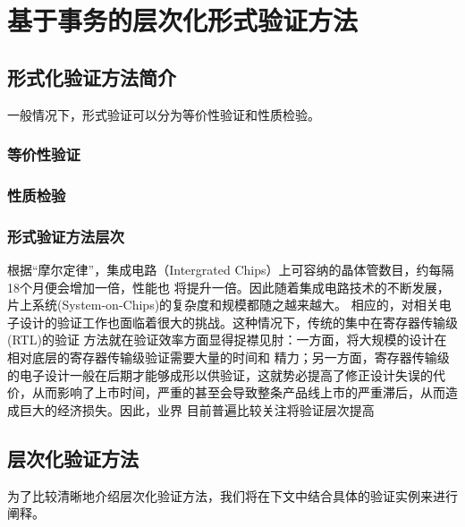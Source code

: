 \graphicspath{{figures/}}

\chapter{基于事务的层次化形式验证方法}
\label{cha:hierarchy}


\section{形式化验证方法简介}
\label{sec:hierarchy-intro}

一般情况下，形式验证可以分为等价性验证和性质检验。

\subsection{等价性验证}
\label{sec:equal}

\subsection{性质检验}
\label{sec:property-checking}

\subsection{形式验证方法层次}
\label{sec:fv-categories}

根据``摩尔定律''，集成电路（Intergrated Chips）上可容纳的晶体管数目，约每隔18个月便会增加一倍，性能也
将提升一倍。因此随着集成电路技术的不断发展，片上系统(System-on-Chips)的复杂度和规模都随之越来越大。
相应的，对相关电子设计的验证工作也面临着很大的挑战。这种情况下，传统的集中在寄存器传输级(RTL)的验证
方法就在验证效率方面显得捉襟见肘：一方面，将大规模的设计在相对底层的寄存器传输级验证需要大量的时间和
精力；另一方面，寄存器传输级的电子设计一般在后期才能够成形以供验证，这就势必提高了修正设计失误的代
价，从而影响了上市时间，严重的甚至会导致整条产品线上市的严重滞后，从而造成巨大的经济损失。因此，业界
目前普遍比较关注将验证层次提高

\section{层次化验证方法}
\label{sec:hierarchy-details}
为了比较清晰地介绍层次化验证方法，我们将在下文中结合具体的验证实例来进行阐释。

